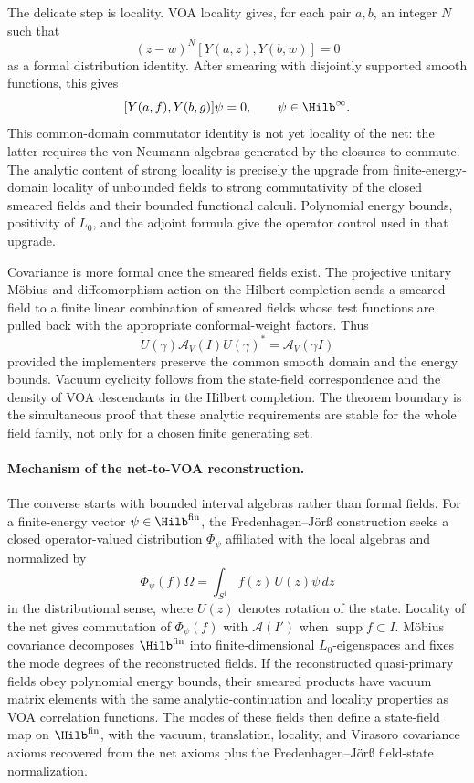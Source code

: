 The delicate step is locality.  VOA locality gives, for each pair \(a,b\),
an integer \(N\) such that
\[
  (z-w)^N[Y(a,z),Y(b,w)]=0
\]
as a formal distribution identity.  After smearing with disjointly supported
smooth functions, this gives
\[
  [Y(a,f),Y(b,g)]\psi=0,\qquad \psi\in\Hilb^\infty .
\]
This common-domain commutator identity is not yet locality of the net: the
latter requires the von Neumann algebras generated by the closures to
commute.  The analytic content of strong locality is precisely the upgrade
from finite-energy-domain locality of unbounded fields to strong
commutativity of the closed smeared fields and their bounded functional
calculi.  Polynomial energy bounds, positivity of \(L_0\), and the adjoint
formula give the operator control used in that upgrade.

Covariance is more formal once the smeared fields exist.  The projective
unitary M\"obius and diffeomorphism action on the Hilbert completion sends a
smeared field to a finite linear combination of smeared fields whose test
functions are pulled back with the appropriate conformal-weight factors.
Thus
\[
  U(\gamma)\mathcal A_V(I)U(\gamma)^*=\mathcal A_V(\gamma I)
\]
provided the implementers preserve the common smooth domain and the energy
bounds.  Vacuum cyclicity follows from the state-field correspondence and
the density of VOA descendants in the Hilbert completion.  The theorem
boundary is the simultaneous proof that these analytic requirements are
stable for the whole field family, not only for a chosen finite generating
set.

\paragraph{Mechanism of the net-to-VOA reconstruction.}
The converse starts with bounded interval algebras rather than formal
fields.  For a finite-energy vector \(\psi\in\Hilb^{\mathrm{fin}}\), the
Fredenhagen--J\"or{\ss} construction seeks a closed operator-valued
distribution \(\Phi_\psi\) affiliated with the local algebras and normalized
by
\[
  \Phi_\psi(f)\Omega
  =
  \int_{S^1}f(z)\,U(z)\psi\,dz
\]
in the distributional sense, where \(U(z)\) denotes rotation of the state.
Locality of the net gives commutation of \(\Phi_\psi(f)\) with
\(\mathcal A(I')\) when \(\operatorname{supp}f\subset I\).  M\"obius
covariance decomposes \(\Hilb^{\mathrm{fin}}\) into finite-dimensional
\(L_0\)-eigenspaces and fixes the mode degrees of the reconstructed fields.
If the reconstructed quasi-primary fields obey polynomial energy bounds,
their smeared products have vacuum matrix elements with the same
analytic-continuation and locality properties as VOA correlation functions.
The modes of these fields then define a state-field map on
\(\Hilb^{\mathrm{fin}}\), with the vacuum, translation, locality, and
Virasoro covariance axioms recovered from the net axioms plus the
Fredenhagen--J\"or{\ss} field-state normalization.

